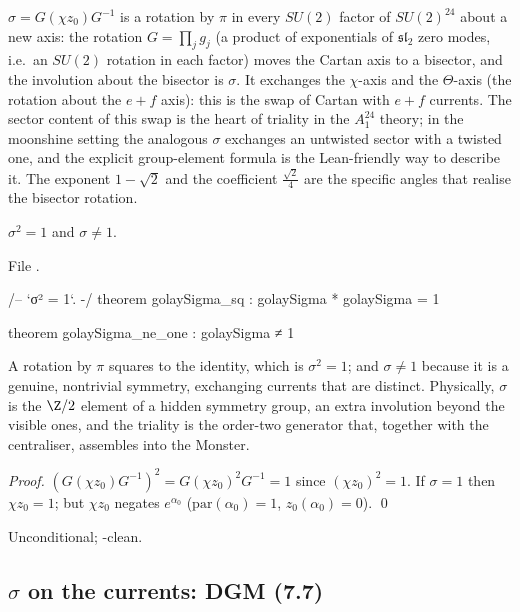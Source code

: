 \begin{physics}
$\sigma=G(\chi z_0)G^{-1}$ is a rotation by $\pi$ in every $SU(2)$ factor of $SU(2)^{24}$ about a new axis: the rotation $G=\prod_jg_j$ (a product of exponentials of $\mathfrak{sl}_2$ zero modes, i.e.\ an $SU(2)$ rotation in each factor) moves the Cartan axis to a bisector, and the involution about the bisector is $\sigma$. It exchanges the $\chi$-axis and the $\Theta$-axis (the rotation about the $e+f$ axis): this is the swap of Cartan with $e+f$ currents. The sector content of this swap is the heart of triality in the $A_1^{24}$ theory; in the moonshine setting the analogous $\sigma$ exchanges an untwisted sector with a twisted one, and the explicit group-element formula is the Lean-friendly way to describe it. The exponent $1-\sqrt2$ and the coefficient $\tfrac{\sqrt2}4$ are the specific angles that realise the bisector rotation.
\end{physics}

\begin{theorem}\label{ch11:thm:sigmasq}
$\sigma^2=1$ and $\sigma\ne1$.
\end{theorem}
\noindent File .
\begin{leancode}
/-- `σ² = 1`. -/
theorem golaySigma_sq : golaySigma * golaySigma = 1

theorem golaySigma_ne_one : golaySigma ≠ 1
\end{leancode}

\begin{physics}
A rotation by $\pi$ squares to the identity, which is $\sigma^2=1$; and $\sigma\ne1$ because it is a genuine, nontrivial symmetry, exchanging currents that are distinct. Physically, $\sigma$ is the $\Z/2$ element of a hidden symmetry group, an extra involution beyond the visible ones, and the triality is the order-two generator that, together with the centraliser, assembles into the Monster.
\end{physics}
\emph{Proof.}  $(G(\chi z_0)G^{-1})^2=G(\chi z_0)^2G^{-1}=1$ since $(\chi z_0)^2=1$.  If $\sigma=1$ then
$\chi z_0=1$; but $\chi z_0$ negates $e^{\alpha_0}$ ($\mathrm{par}(\alpha_0)=1$, $z_0(\alpha_0)=0$). \qed
\begin{status}Unconditional; -clean.\end{status}

\subsection{\texorpdfstring{$\sigma$}{sigma} on the currents: DGM (7.7)}

